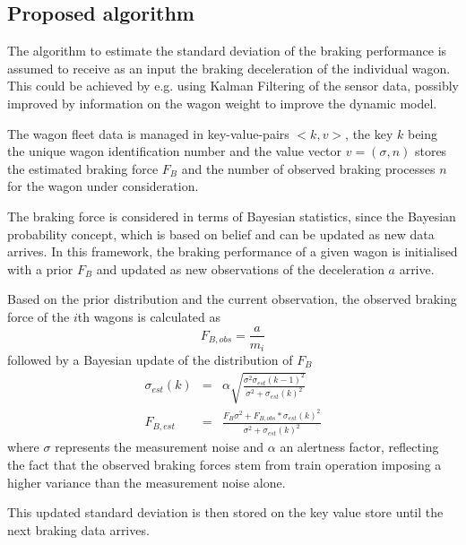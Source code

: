 \documentclass[a4paper, 12pt]{scrartcl}
\begin{document}
\subsection{Proposed algorithm}
The algorithm to estimate the standard deviation of the braking performance is assumed to receive as an input the braking deceleration of the individual wagon. This could be achieved by e.g. using Kalman Filtering of the sensor data, possibly improved by information on the wagon weight to improve the dynamic model.

The wagon fleet data is managed in key-value-pairs $<k, v>$, the key $k$ being the unique wagon identification number and the value vector $v = \left(\sigma, n\right)$ stores the estimated braking force $F_{B}$ and the number of observed braking processes $n$ for the wagon under consideration.

The braking force is considered in terms of Bayesian statistics, since the Bayesian probability concept, which is based on belief and can be updated as new data arrives. In this framework, the braking performance of a given wagon is initialised with a prior $F_{B}$ and updated as new observations of the deceleration $a$ arrive.

Based on the prior distribution and the current observation, the observed braking force of the $i$th wagons is calculated as 
\begin{equation}
F_{B, obs} =\frac{a}{m_{i}}
\end{equation}
followed by a Bayesian update of the distribution of $F_{B}$
\begin{eqnarray}
\sigma_{est}(k) &=& \alpha \sqrt{\frac{\sigma^2 \sigma_{est}(k-1)^2}{\sigma^2+\sigma_{est}(k)^2}}\\
F_{B,est} &=& \frac{F_{B} \sigma^2 + F_{B, obs}*\sigma_{est}(k)^2}{\sigma^2+\sigma_{est}(k)^2} 
\end{eqnarray}
where $\sigma$ represents the measurement noise and $\alpha$ an alertness factor, reflecting the fact that the observed braking forces stem from train operation imposing a higher variance than the measurement noise alone.

This updated standard deviation is then stored on the key value store until the next braking data arrives.
\end{document}
